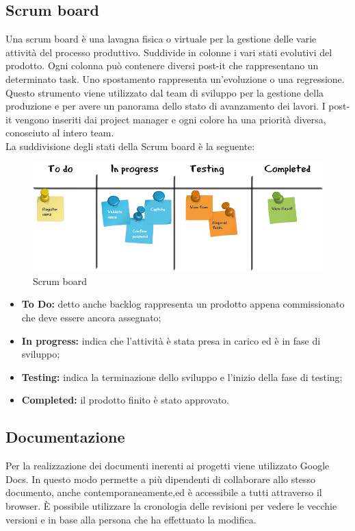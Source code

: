 \subsection*{Scrum board}
Una scrum board è una lavagna fisica o virtuale per la gestione delle varie attività del processo produttivo. Suddivide in colonne i vari stati evolutivi del prodotto. Ogni colonna può contenere diversi post-it che rappresentano un determinato task. Uno spostamento rappresenta un'evoluzione o una regressione. Questo strumento viene utilizzato dal team di sviluppo per la gestione della produzione e per avere un panorama dello stato di avanzamento dei lavori. I post-it vengono inseriti dai project manager e ogni colore ha una priorità diversa, conosciuto al intero team. \\
La suddivisione degli stati della Scrum board è la seguente:

\begin{figure}[h]
\centering
\includegraphics[width=0.7\linewidth]{immagini/scrum-board}
\caption[Scrum board]{Scrum board}
\label{fig:scrum-board}
\end{figure}

\begin{itemize}
	\item \textbf{To Do: }detto anche backlog rappresenta un prodotto appena commissionato che deve essere ancora assegnato;
	\item \textbf{In progress: }indica che l'attività è stata presa in carico ed è in fase di sviluppo;
	\item \textbf{Testing: }indica la terminazione dello sviluppo e l'inizio della fase di testing;
	\item \textbf{Completed: }il prodotto finito è stato approvato.
\end{itemize}

\subsection*{Documentazione}
Per la realizzazione dei documenti inerenti ai progetti viene utilizzato Google Docs. In questo modo permette a più dipendenti di collaborare allo stesso documento, anche contemporaneamente,ed è accessibile a tutti attraverso il browser. È possibile utilizzare la cronologia delle revisioni per vedere le vecchie versioni e in base alla persona che ha effettuato la modifica.

